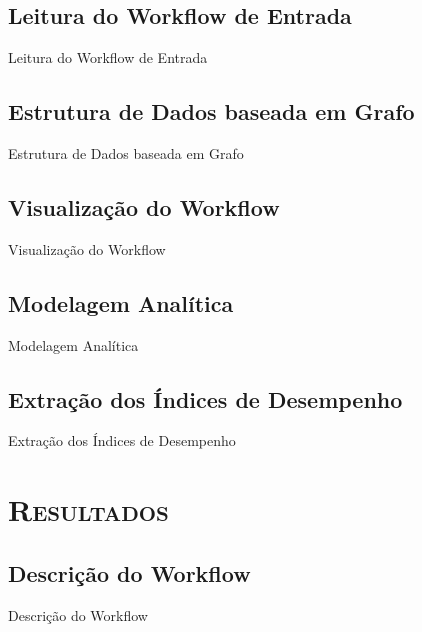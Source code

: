 \documentclass[xcolor=x11names,compress]{beamer}
\renewcommand{\(}{\begin{columns}}
\renewcommand{\)}{\end{columns}}
\newcommand{\<}[1]{\begin{column}{#1}}
\renewcommand{\>}{\end{column}}
\begin{document}
    \subsection{Leitura do Workflow de Entrada}
        \begin{frame}{Leitura do Workflow de Entrada}

        \end{frame}

    \subsection{Estrutura de Dados baseada em Grafo}
        \begin{frame}{Estrutura de Dados baseada em Grafo}

        \end{frame}

    \subsection{Visualização do Workflow}
        \begin{frame}{Visualização do Workflow}

        \end{frame}

    \subsection{Modelagem Analítica}
        \begin{frame}{Modelagem Analítica}

        \end{frame}

    \subsection{Extração dos Índices de Desempenho}
        \begin{frame}{Extração dos Índices de Desempenho}

        \end{frame}

\section{\scshape Resultados}

    \subsection{Descrição do Workflow}
        \begin{frame}{Descrição do Workflow}

        \end{frame}
\end{document}
